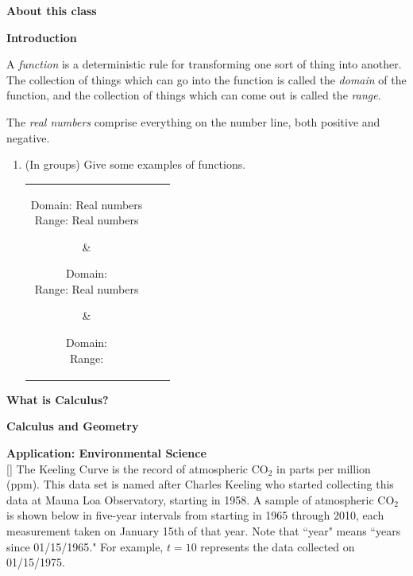 \documentclass[10pt]{article}
\begin{document}
\pagestyle{otherpages}
\thispagestyle{firstpage}



{\bf\color{blue}About this class}

\vfill

{\bf\color{blue}Introduction}

A \textit{function} is a deterministic rule for transforming one sort of thing into another. The collection of things which can go into the function is called the \textit{domain} of the function, and the collection of things which can come out is called the \textit{range}.

The \textit{real numbers} comprise everything on the number line, both positive and negative.

\begin{enumerate}
    \item (In groups) Give some examples of functions.\\[0.5cm]
    \begin{tabular}{c | c | c}
         \parbox{0.3\textwidth}{
            Domain: Real numbers\\[7pt]
            Range: Real numbers
            \vspace{4cm}
         }
         &
         \parbox{0.3\textwidth}{
            Domain: \underline{\hspace{3cm}}\\[7pt]
            Range: Real numbers
            \vspace{4cm}
         }
         &
         \parbox{0.3\textwidth}{
            Domain: \underline{\hspace{3cm}}\\[7pt]
            Range: \underline{\hspace{3cm}}
            \vspace{4cm}
         }
    \end{tabular}
\end{enumerate}
\vspace{0.5cm}

\newpage

{\bf What is Calculus?}
\vspace{8cm}

{\bf Calculus and Geometry}

\vspace{6.5cm}



{\bf\color{blue} Application: Environmental Science}\\
[]{
The Keeling Curve is the record of atmospheric CO$_2$ in parts per million (ppm). This data set is named after Charles Keeling who started collecting this data at Mauna Loa Observatory, starting in 1958.  A sample of atmospheric CO$_2$ is shown below in five-year intervals from starting in 1965 through 2010, each measurement taken on January 15th of that year.  Note that ``year" means ``years since 01/15/1965."  For example, $t=10$ represents the data collected on 01/15/1975.
}{
}
\end{document}
